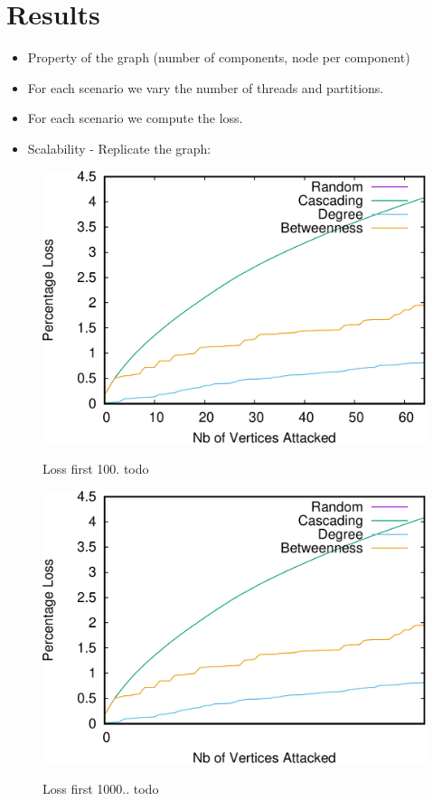 \section{Results}
\begin{itemize}
\item Property of the graph (number of components, node per component)

\item For each scenario we vary the number of threads and partitions. 

\item For each scenario we compute the loss. 

\item Scalability - Replicate the graph:
\end{itemize}

\begin{figure}
\centering
\includegraphics[scale=0.3]{bench/loss-100-crop.pdf}
\label{fig:loss-100}
\caption{Loss first 100. todo}
\end{figure}

\begin{figure}
\centering
\includegraphics[scale=0.3]{bench/loss-1000-crop.pdf}
\label{fig:loss-1000}
\caption{Loss first 1000.. todo}
\end{figure}

